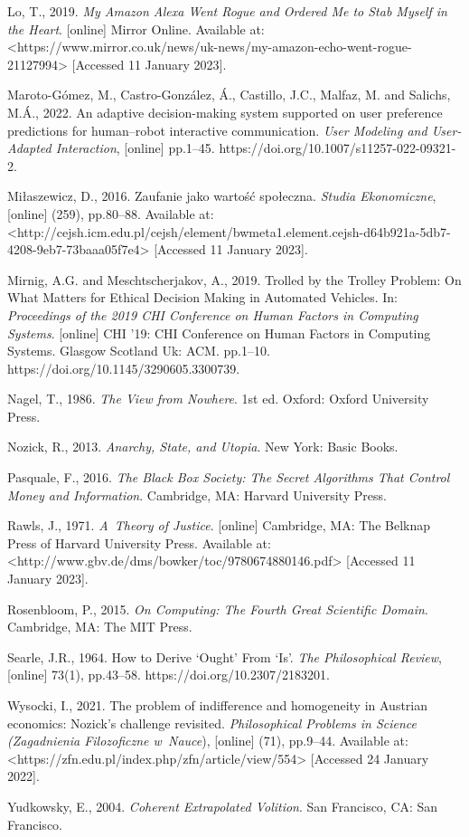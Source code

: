 Lo, T., 2019. \textit{My Amazon Alexa Went Rogue and Ordered Me to Stab Myself in the Heart}. [online] Mirror Online. Available at: {\textless}https://www.mirror.co.uk/news/uk-news/my-amazon-echo-went-rogue-21127994{\textgreater} [Accessed 11 January 2023].

Maroto-Gómez, M., Castro-González, Á., Castillo, J.C., Malfaz, M. and Salichs, M.Á., 2022. An adaptive decision-making system supported on user preference predictions for human–robot interactive communication. \textit{User Modeling and User-Adapted Interaction}, [online] pp.1–45. https://doi.org/10.1007/s11257-022-09321-2.

Miłaszewicz, D., 2016. Zaufanie jako wartość społeczna. \textit{Studia Ekonomiczne}, [online] (259), pp.80–88. Available at: {\textless}http://cejsh.icm.edu.pl/cejsh/element/bwmeta1.element.cejsh-d64b921a-5db7-4208-9eb7-73baaa05f7e4{\textgreater} [Accessed 11 January 2023].

Mirnig, A.G. and Meschtscherjakov, A., 2019. Trolled by the Trolley Problem: On What Matters for Ethical Decision Making in Automated Vehicles. In: \textit{Proceedings of the 2019 CHI Conference on Human Factors in Computing Systems}. [online] CHI '19: CHI Conference on Human Factors in Computing Systems. Glasgow Scotland Uk: ACM. pp.1–10. https://doi.org/10.1145/3290605.3300739.

Nagel, T., 1986. \textit{The View from Nowhere}. 1st ed. Oxford: Oxford University Press.

Nozick, R., 2013. \textit{Anarchy, State, and Utopia}. New York: Basic Books.

Pasquale, F., 2016. \textit{The Black Box Society: The Secret Algorithms That Control Money and Information}. Cambridge, MA: Harvard University Press.

Rawls, J., 1971. \textit{A~Theory of Justice}. [online] Cambridge, MA: The Belknap Press of Harvard University Press. Available at: {\textless}http://www.gbv.de/dms/bowker/toc/9780674880146.pdf{\textgreater} [Accessed 11 January 2023].

Rosenbloom, P., 2015. \textit{On Computing: The Fourth Great Scientific Domain}. Cambridge, MA: The MIT Press.

Searle, J.R., 1964. How to Derive ‘Ought' From ‘Is'. \textit{The Philosophical Review}, [online] 73(1), pp.43–58. https://doi.org/10.2307/2183201.

Wysocki, I., 2021. The problem of indifference and homogeneity in Austrian economics: Nozick's challenge revisited. \textit{Philosophical Problems in Science (Zagadnienia Filozoficzne w~Nauce}), [online] (71), pp.9–44. Available at: {\textless}https://zfn.edu.pl/index.php/zfn/article/view/554{\textgreater} [Accessed 24 January 2022].

Yudkowsky, E., 2004. \textit{Coherent Extrapolated Volition}. San Francisco, CA: San Francisco.

